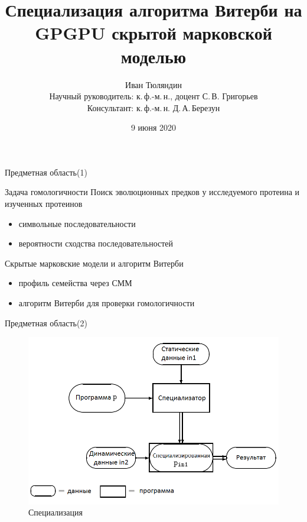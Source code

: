 \documentclass[hyperref={pdfpagelabels=false}]{beamer}
\begin{document}
  
\title[Специализация алгоритма Витерби]{Специализация алгоритма Витерби на GPGPU скрытой марковской моделью}  
\author[И. Тюляндин]{Иван Тюляндин\\%
Научный руководитель: к.\,ф.-м.\,н., доцент С.\,В. Григорьев\\%
Консультант: к.\,ф.-м.\,н. Д.\,А.\,Березун\\%
} 
\date{9 июня 2020} 
{
}


\begin{frame}{Предметная область(1)}
\begin{block}{Задача гомологичности}
	Поиск эволюционных предков у исследуемого протеина и изученных протеинов
	\begin{itemize}
		\item символьные последовательности
		\item вероятности сходства последовательностей
	\end{itemize}
\end{block}
\vfill
\begin{block}{Скрытые марковские модели и алгоритм Витерби}
\begin{itemize}
	\item профиль семейства через СММ
	\item алгоритм Витерби для проверки гомологичности
\end{itemize}
\end{block}
\end{frame} 


\begin{frame}{Предметная область(2)}
\begin{figure}
	\includegraphics[scale=0.45]{spec.png}
	\caption{Специализация}
\end{figure}
\end{frame} 
\end{document}
